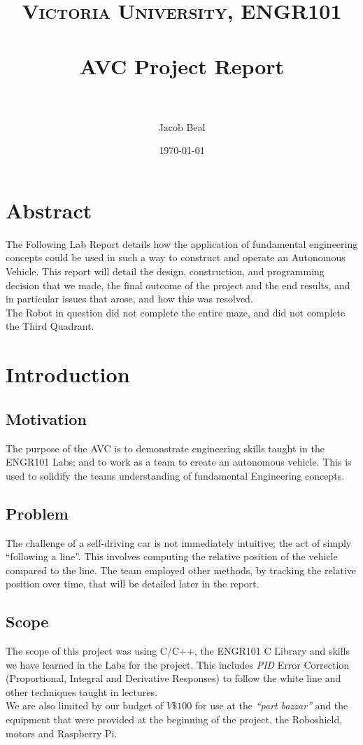 \documentclass[paper=a4, fontsize=11pt]{scrartcl} %
\title{
\normalfont\normalsize
\textsc{Victoria University, ENGR101} \\ [25pt] %
\horrule{0.5pt} \\[0.4cm] %
\huge AVC Project Report\\ %
\horrule{2pt} \\[0.5cm] %
}
\author{Jacob Beal} %
\date{\normalsize\today} %
\numberwithin{equation}{section} %
\numberwithin{figure}{section} %
\begin{document}
\maketitle
\pagebreak
\tableofcontents
\pagebreak
\section{Abstract}
The Following Lab Report details how the application of fundamental engineering
concepts could be used in such a way to construct and operate an Autonomous
Vehicle. This report will detail the design, construction, and programming
decision that we made, the final outcome of the project and the end results,
and in particular issues that arose, and how this was resolved.\\

The Robot in question did not complete the entire maze, and did not complete the
Third Quadrant.
\section{Introduction}
\subsection{Motivation}
The purpose of the AVC is to demonstrate engineering skills taught in the
ENGR101 Labs; and to work as a team to create an autonomous vehicle. This is
used to solidify the teams understanding of fundamental Engineering concepts.
\subsection{Problem}
The challenge of a self-driving car is not immediately intuitive; the act of %
simply ``following a line''. This involves computing the relative position of
the vehicle compared to the line. The team employed other methods, by tracking
the relative position over time, that will be detailed later in the report.
\subsection{Scope}
The scope of this project was using C/C++, the ENGR101 C Library and skills we
have learned in the Labs for the project. This includes \textit{PID} Error
Correction (Proportional, Integral and Derivative Responses) to follow the 
white line and other techniques taught in lectures.\\
We are also limited by our budget of $V\$100$ for use at the \textit{``part
  bazzar''} and the equipment that were provided at the beginning of the
project, the Roboshield, motors and Raspberry Pi.
\end{document}
